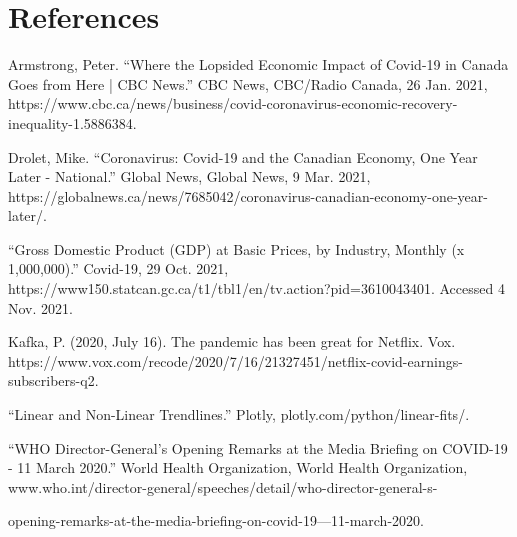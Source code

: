 \documentclass[fontsize=11pt]{article}
\begin{document}
\section*{References}


Armstrong, Peter. “Where the Lopsided Economic Impact of Covid-19 in Canada Goes from Here | CBC News.” CBC News, CBC/Radio Canada, 26 Jan. 2021, https://www.cbc.ca/news/business/covid-coronavirus-economic-recovery-inequality-1.5886384. 

\medskip

Drolet, Mike. “Coronavirus: Covid-19 and the Canadian Economy, One Year Later - National.” Global News, Global News, 9 Mar. 2021, https://globalnews.ca/news/7685042/coronavirus-canadian-economy-one-year-later/.  

\medskip

 “Gross Domestic Product (GDP) at Basic Prices, by Industry, Monthly (x 1,000,000).” Covid-19, 29 Oct. 2021, https://www150.statcan.gc.ca/t1/tbl1/en/tv.action?pid=3610043401. Accessed 4 Nov. 2021.

\medskip

Kafka, P. (2020, July 16). The pandemic has been great for Netflix. Vox.  https://www.vox.com/recode/2020/7/16/21327451/netflix-covid-earnings-subscribers-q2. 

\medskip

“Linear and Non-Linear Trendlines.” Plotly, plotly.com/python/linear-fits/.

\medskip

“WHO Director-General's Opening Remarks at the Media Briefing on COVID-19 - 11 March 2020.” World Health Organization, World Health Organization, www.who.int/director-general/speeches/detail/who-director-general-s-

opening-remarks-at-the-media-briefing-on-covid-19---11-march-2020. 
\end{document}
